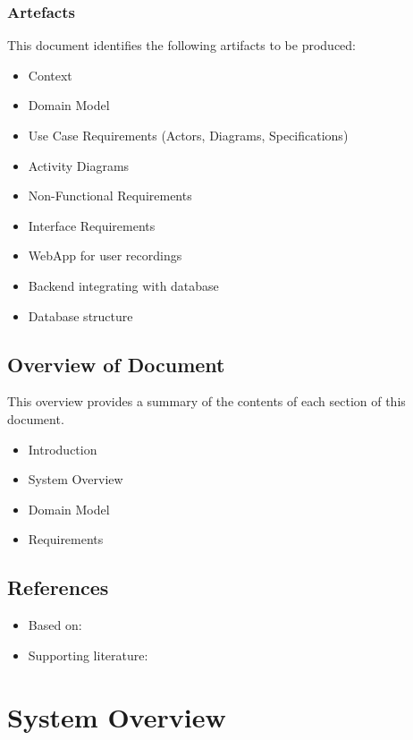 \subsubsection{Artefacts}
\label{appendix:srs:artefacts}

This document identifies the following artifacts to be produced:

\begin{itemize}
    \item Context
    \item Domain Model
    \item Use Case Requirements (Actors, Diagrams, Specifications)
    \item Activity Diagrams
    \item Non-Functional Requirements
    \item Interface Requirements
    \item WebApp for user recordings
    \item Backend integrating with database
    \item Database structure
\end{itemize}

\subsection{Overview of Document}

This overview provides a summary of the contents of each section of this document.

\begin{itemize}
    \item Introduction
    \item System Overview
    \item Domain Model
    \item Requirements
\end{itemize}

\subsection{References}

\begin{itemize}
    \item Based on: \cite{naoufel2014requirements}
    \item Supporting literature: \cite{pressman2014software}
\end{itemize}

\section{System Overview}
\label{appendix:srs:system-overview}

